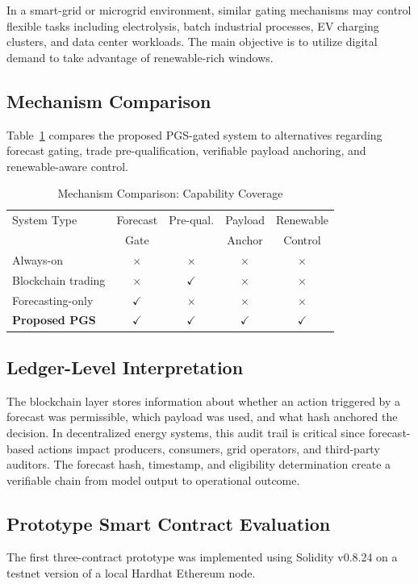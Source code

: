 \documentclass{ieeeaccess}
\begin{document}
In a smart-grid or microgrid environment, similar gating mechanisms may control flexible tasks including electrolysis, batch industrial processes, EV charging clusters, and data center workloads. The main objective is to utilize digital demand to take advantage of renewable-rich windows.

\subsection{Mechanism Comparison}
Table~\ref{tab:mechanism} compares the proposed PGS-gated system to alternatives regarding forecast gating, trade pre-qualification, verifiable payload anchoring, and renewable-aware control.

\begin{table}[!t]
\caption{Mechanism Comparison: Capability Coverage}
\label{tab:mechanism}
\centering
\begin{tabular}{lcccc}
\toprule
System Type & Forecast & Pre-qual. & Payload & Renewable \\
 & Gate & & Anchor & Control \\
\midrule
Always-on & $\times$ & $\times$ & $\times$ & $\times$ \\
Blockchain trading & $\times$ & $\checkmark$ & $\times$ & $\times$ \\
Forecasting-only & $\checkmark$ & $\times$ & $\times$ & $\times$ \\
\textbf{Proposed PGS} & $\checkmark$ & $\checkmark$ & $\checkmark$ & $\checkmark$ \\
\bottomrule
\end{tabular}
\end{table}

\subsection{Ledger-Level Interpretation}
The blockchain layer stores information about whether an action triggered by a forecast was permissible, which payload was used, and what hash anchored the decision. In decentralized energy systems, this audit trail is critical since forecast-based actions impact producers, consumers, grid operators, and third-party auditors. The forecast hash, timestamp, and eligibility determination create a verifiable chain from model output to operational outcome.

\subsection{Prototype Smart Contract Evaluation}
The first three-contract prototype was implemented using Solidity v0.8.24 on a testnet version of a local Hardhat Ethereum node.
\end{document}
